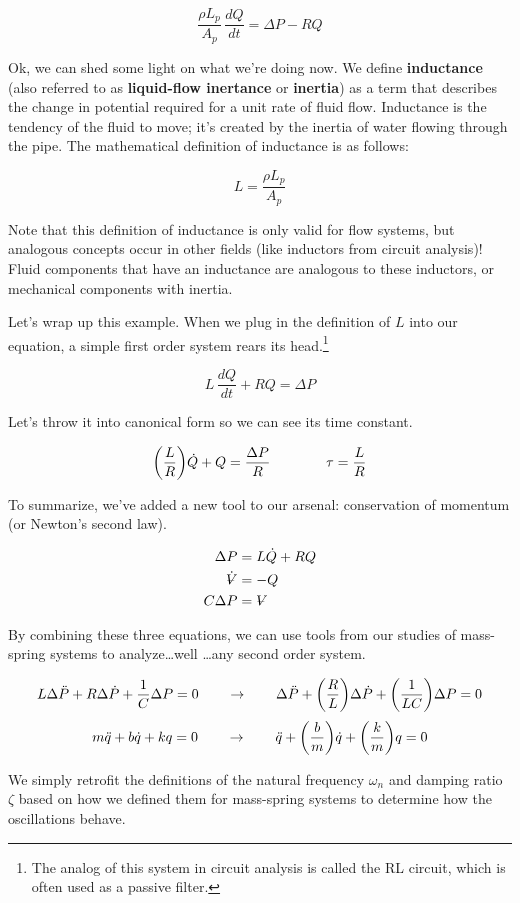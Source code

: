 \documentclass{article}
\newcommand{\Volume}{{\ooalign{\hfil$V$\hfil\cr\kern0.08em--\hfil\cr}}}
\begin{document}
\begin{onehalfspacing}
\begin{flushleft}
\vspace{-0.1in}
\[\frac{\rho L_p}{A_p} \, \frac{dQ}{dt} = \Delta P - RQ\]

Ok, we can shed some light on what we're doing now. We define \textbf{inductance} (also referred to as \textbf{liquid-flow inertance} or \textbf{inertia}) as a term that describes the change in potential required for a unit rate of fluid flow. Inductance is the tendency of the fluid to move; it's created by the inertia of water flowing through the pipe. The mathematical definition of inductance is as follows:

\vspace{-0.1in}
\[L = \frac{\rho L_p}{A_p}\]

Note that this definition of inductance is only valid for flow systems, but analogous concepts occur in other fields (like inductors from circuit analysis)! Fluid components that have an inductance are analogous to these inductors, or mechanical components with inertia. 

\medskip

Let's wrap up this example. When we plug in the definition of \(L\) into our equation, a simple first order system rears its head.\footnote{The analog of this system in circuit analysis is called the RL circuit, which is often used as a passive filter.}

\vspace{-0.1in}
\[L \, \frac{dQ}{dt} + RQ = \Delta P\]

Let's throw it into canonical form so we can see its time constant.

\vspace{-0.1in}
\[\qty(\frac{L}{R}) \dot{Q} + Q = \frac{\Delta P}{R} \qquad \qquad \tau = \frac{L}{R}\]

To summarize, we've added a new tool to our arsenal: conservation of momentum (or Newton's second law). 

\vspace{-0.25in}
\begin{align*}
    \Delta P &= L \dot{Q} + RQ \\
    \dot{\Volume} &= -Q\\
    C \Delta P &= \Volume
\end{align*}
\vspace{-0.25in}

By combining these three equations, we can use tools from our studies of mass-spring systems to analyze\dots well \dots any second order system.

\vspace{-0.1in}
\[L \Delta \ddot{P} + R \Delta \dot{P} + \frac{1}{C} \Delta P = 0 \qquad \to \qquad \Delta \ddot{P} + \qty(\frac{R}{L}) \Delta \dot{P} + \qty(\frac{1}{LC}) \Delta P = 0\]
\[m \ddot{q} + b \dot{q} + k q = 0 \qquad \to \qquad \ddot{q} + \qty(\frac{b}{m}) \dot{q} + \qty(\frac{k}{m}) q = 0\]

We simply retrofit the definitions of the natural frequency \(\omega_n\) and damping ratio \(\zeta\) based on how we defined them for mass-spring systems to determine how the oscillations behave.

\end{flushleft}
\end{onehalfspacing}
\end{document}
